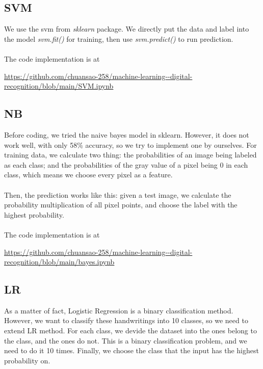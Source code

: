 \documentclass{article}
\begin{document}
	\subsection{SVM}
	
	We use the svm from \textit{sklearn} package. We directly put the data and label into the model \textit{svm.fit()} for training, then use \textit{svm.predict()} to run prediction. \\ \\
	The code implementation is at
	\begin{center}
		\url{https://github.com/chuansao-258/machine-learning--digital-recognition/blob/main/SVM.ipynb}
	\end{center}
	
	\subsection{NB}
	
	 Before coding, we tried the naive bayes model in sklearn. However, it does not work well, with only 58\% accuracy, so we try to implement one by ourselves. For training data, we calculate two thing: the probabilities of an image being labeled as each class; and the probabilities of the gray value of a pixel being $0$ in each class, which means we choose every pixel as a feature. \\ \\
	 Then, the prediction works like this: given a test image, we calculate the probability multiplication of all pixel points, and choose the label with the highest probability. \\ \\
	 The code implementation is at 
	 \begin{center}
	 	\url{https://github.com/chuansao-258/machine-learning--digital-recognition/blob/main/bayes.ipynb}
	 \end{center}
 	 
 	 \subsection{LR}
 	 
 	 As a matter of fact, Logistic Regression is a binary classification method. However, we want to classify these handwritings into 10 classes, so we need to extend LR method. For each class, we devide the dataset into the ones belong to the class, and the ones do not. This is a binary classification problem, and we need to do it 10 times. Finally, we choose the class that the input has the highest probability on.
 	 
\end{document}
